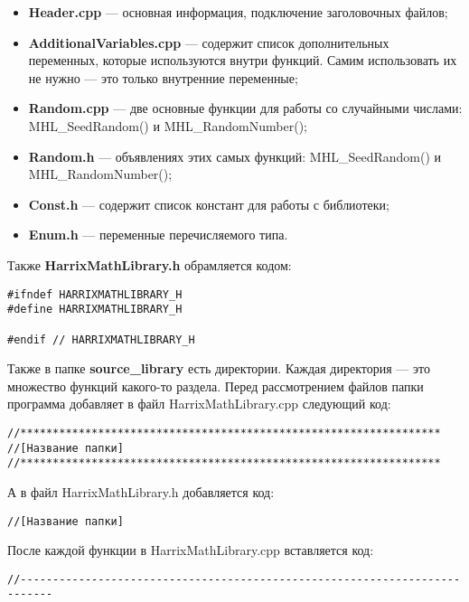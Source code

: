 \documentclass[a4paper,12pt]{article}
\begin{document}
\begin{itemize}
\item \textbf{Header.cpp} --- основная информация, подключение заголовочных файлов;
\item \textbf{AdditionalVariables.cpp} --- содержит список дополнительных переменных, которые используются внутри функций. Самим использовать их не нужно --- это только внутренние переменные;
\item \textbf{Random.cpp} --- две основные функции для работы со случайными числами: MHL\_SeedRandom() и MHL\_RandomNumber();
\item \textbf{Random.h} --- объявлениях этих самых функций: MHL\_SeedRandom() и MHL\_RandomNumber();
\item \textbf{Const.h} --- содержит список констант для работы с библиотеки;
\item \textbf{Enum.h} --- переменные перечисляемого типа.
\end{itemize}

Также \textbf{HarrixMathLibrary.h} обрамляется кодом:
\begin{lstlisting}[label=make_sectioncpp,caption=Обрамление HarrixMathLibrary.h файла]
#ifndef HARRIXMATHLIBRARY_H
#define HARRIXMATHLIBRARY_H

#endif // HARRIXMATHLIBRARY_H
\end{lstlisting}

Также в папке \textbf{source\_library} есть директории. Каждая директория --- это множество функций какого-то раздела. Перед рассмотрением файлов папки программа добавляет в файл HarrixMathLibrary.cpp следующий код:

\begin{lstlisting}[label=make_sectioncpp,caption=Название раздела]
//*****************************************************************
//[Название папки]
//*****************************************************************
\end{lstlisting}

А в файл HarrixMathLibrary.h добавляется код:

\begin{lstlisting}[label=make_sectionh,caption=Название раздела]
//[Название папки]
\end{lstlisting}

После каждой функции в HarrixMathLibrary.cpp вставляется код:
\begin{lstlisting}[label=make_sectionh,caption=Название раздела]
//---------------------------------------------------------------------------
\end{lstlisting}
\end{document}
